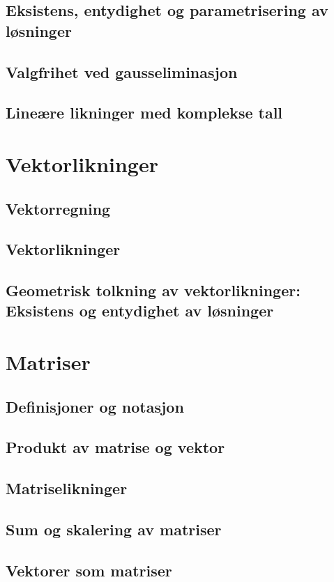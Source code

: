 \documentclass{article}
\begin{document}
\subsection{Eksistens, entydighet og parametrisering av løsninger}
\subsection{Valgfrihet ved gausseliminasjon}
\subsection{Lineære likninger med komplekse tall}


\section{Vektorlikninger}

\subsection{Vektorregning}
\subsection{Vektorlikninger}
\subsection{Geometrisk tolkning av vektorlikninger: Eksistens og entydighet av løsninger}


\section{Matriser}

\subsection{Definisjoner og notasjon}
\subsection{Produkt av matrise og vektor}
\subsection{Matriselikninger}
\subsection{Sum og skalering av matriser}
\subsection{Vektorer som matriser}
\end{document}
